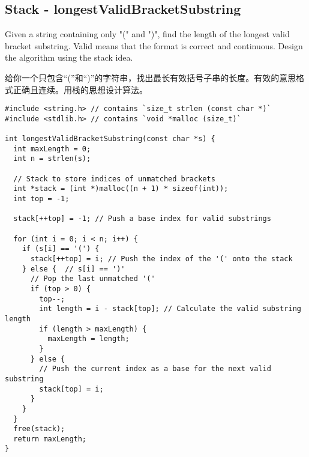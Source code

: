 \documentclass[a4paper]{article}
\begin{document}
\newpage

\subsection{Stack - longestValidBracketSubstring}

Given a string containing only "(" and ")", find the length of the longest valid bracket substring. Valid means that the format is correct and continuous. Design the algorithm using the stack idea.

给你一个只包含“(”和“)”的字符串，找出最长有效括号子串的长度。有效的意思格式正确且连续。用栈的思想设计算法。

\begin{verbatim}
#include <string.h> // contains `size_t strlen (const char *)`
#include <stdlib.h> // contains `void *malloc (size_t)`

int longestValidBracketSubstring(const char *s) {
  int maxLength = 0;
  int n = strlen(s);

  // Stack to store indices of unmatched brackets
  int *stack = (int *)malloc((n + 1) * sizeof(int));
  int top = -1;

  stack[++top] = -1; // Push a base index for valid substrings

  for (int i = 0; i < n; i++) {
    if (s[i] == '(') {
      stack[++top] = i; // Push the index of the '(' onto the stack
    } else {  // s[i] == ')'
      // Pop the last unmatched '('
      if (top > 0) {
        top--;
        int length = i - stack[top]; // Calculate the valid substring length
        if (length > maxLength) {
          maxLength = length;
        }
      } else {
        // Push the current index as a base for the next valid substring
        stack[top] = i;
      }
    }
  }
  free(stack);
  return maxLength;
}
\end{verbatim}

\newpage
\end{document}

